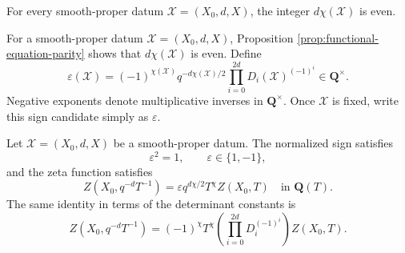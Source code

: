 
\begin{proposition}
\label{prop:functional-equation-parity}


For every smooth-proper datum \(\mathscr X=(X_0,d,X)\), the integer
\(d\chi(\mathscr X)\) is even.
\end{proposition}




\begin{definition}
\label{def:functional-equation-sign}


For a smooth-proper datum \(\mathscr X=(X_0,d,X)\), Proposition
\ref{prop:functional-equation-parity} shows that \(d\chi(\mathscr X)\) is
even.  Define
\[
 \varepsilon(\mathscr X)=
 (-1)^{\chi(\mathscr X)}q^{-d\chi(\mathscr X)/2}
 \prod_{i=0}^{2d}D_i(\mathscr X)^{(-1)^i}
 \in\mathbf Q^\times.
\]
Negative exponents denote multiplicative inverses in \(\mathbf Q^\times\).
Once \(\mathscr X\) is fixed, write this sign candidate simply as
\(\varepsilon\).
\end{definition}


\begin{proposition}
\label{prop:functional-equation}


Let \(\mathscr X=(X_0,d,X)\) be a smooth-proper datum.  The normalized sign satisfies
\[
 \varepsilon^2=1,\qquad \varepsilon\in\{1,-1\},
\]
and the zeta function satisfies
\[
 Z(X_0,q^{-d}T^{-1})
 =\varepsilon q^{d\chi/2}T^\chi Z(X_0,T)
 \quad\text{in }\mathbf Q(T).
\]
The same identity in terms of the determinant constants is
\[
 Z(X_0,q^{-d}T^{-1})
 =(-1)^\chi T^\chi
 \left(\prod_{i=0}^{2d}D_i^{(-1)^i}\right)Z(X_0,T).
\]
\end{proposition}


